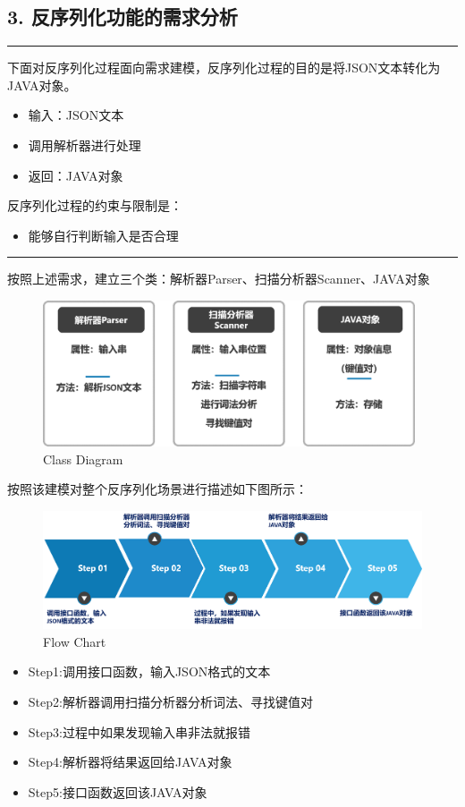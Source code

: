 \documentclass{article}
\begin{document}
\subsection*{3. 反序列化功能的需求分析}
\noindent \rule{\textwidth}{0.7mm}
下面对反序列化过程面向需求建模，反序列化过程的目的是将JSON文本转化为JAVA对象。
\begin{itemize}
\item 输入：JSON文本
\item 调用解析器进行处理
\item 返回：JAVA对象
\end{itemize}
反序列化过程的约束与限制是：
\begin{itemize}
\item 能够自行判断输入是否合理
\end{itemize}
\rule{\textwidth}{0.7mm}
按照上述需求，建立三个类：解析器Parser、扫描分析器Scanner、JAVA对象
\begin{figure}[H]
\centering %
\includegraphics[width = 11cm]{pic7.png}
\caption{Class Diagram}
\end{figure}

按照该建模对整个反序列化场景进行描述如下图所示：
\begin{figure}[H]
\centering %
\includegraphics[width = 15cm]{pic8.png}
\caption{Flow Chart}
\end{figure}
\begin{itemize}
\item Step1:调用接口函数，输入JSON格式的文本
\item Step2:解析器调用扫描分析器分析词法、寻找键值对
\item Step3:过程中如果发现输入串非法就报错
\item Step4:解析器将结果返回给JAVA对象
\item Step5:接口函数返回该JAVA对象
\end{itemize}
\end{document}
